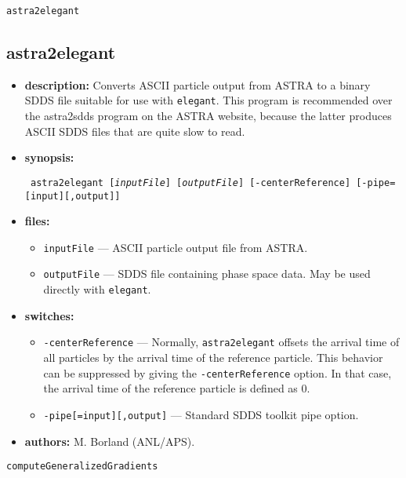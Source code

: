 \documentclass[11pt]{article}
\begin{document}
\newpage
\begin{center}{\Large\verb|astra2elegant|}\end{center}
\subsection{astra2elegant}

\begin{itemize}
\item {\bf description:}   Converts ASCII particle output from ASTRA to a binary
SDDS file suitable for use with {\tt elegant}.  This program is recommended over
the astra2sdds program on the ASTRA website, because the latter produces ASCII SDDS
files that are quite slow to read.

\item {\bf synopsis:}
\begin{flushleft}{\tt
astra2elegant [{\em inputFile}] [{\em outputFile}] [-centerReference] [-pipe=[input][,output]]
}\end{flushleft}

\item {\bf files:}
\begin{itemize}
\item {\tt inputFile} --- ASCII particle output file from ASTRA.
\item {\tt outputFile} --- SDDS file containing phase space data. May be used directly with 
{\tt elegant}.
\end{itemize}

\item {\bf switches:}
\begin{itemize}
\item {\tt -centerReference} --- Normally, {\tt astra2elegant} offsets the arrival time of all particles
  by the arrival time of the reference particle.  This behavior can be suppressed by giving the
  {\tt -centerReference} option.  In that case, the arrival time of the reference particle is defined
  as 0.
\item {\tt -pipe[=input][,output]} --- Standard SDDS toolkit pipe option.
\end{itemize}

\item {\bf authors:} M. Borland (ANL/APS).

\end{itemize}

\newpage
\begin{center}{\Large\verb|computeGeneralizedGradients|}\end{center}
\end{document}
